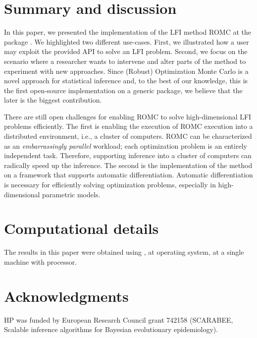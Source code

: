 \documentclass[article, shortnames]{jss}
\begin{document}
\section{Summary and discussion} \label{sec:summary}

In this paper, we presented the implementation of the LFI method ROMC
at the  package . We highlighted two
different use-cases. First, we illustrated how a user may exploit the
provided API to solve an LFI problem. Second, we focus on the scenario
where a researcher wants to intervene and alter parts of the method to
experiment with new approaches. Since (Robust) Optimization Monte
Carlo is a novel approach for statistical inference and, to the best
of our knowledge, this is the first open-source implementation on a
generic package, we believe that the later is the biggest
contribution.

There are still open challenges for enabling ROMC to solve
high-dimensional LFI problems efficiently. The first is enabling the
execution of ROMC execution into a distributed environment, i.e., a
cluster of computers. ROMC can be characterized as an
\textit{embarrassingly parallel} workload; each optimization problem
is an entirely independent task. Therefore, supporting inference into
a cluster of computers can radically speed up the inference. The
second is the implementation of the method on a framework that supports
automatic differentiation. Automatic differentiation is necessary for
efficiently solving optimization problems, especially in
high-dimensional parametric models.



\section*{Computational details}

The results in this paper were obtained using ,
 at  operating system, at a
single machine with  processor.

\section*{Acknowledgments}

HP was funded by European Research Council grant 742158 (SCARABEE,
Scalable inference algorithms for Bayesian evolutionary epidemiology).

\clearpage


\end{document}
